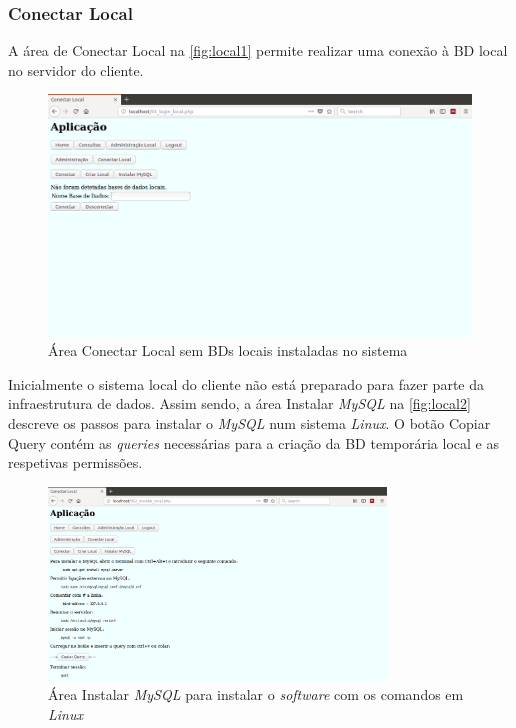 \documentclass[11pt,twoside,a4paper]{report}
\begin{document}
\subsubsection{Conectar Local}
\label{subchap:local}
A área de Conectar Local na \autoref{fig:local1} permite realizar uma conexão à BD local no servidor do cliente.
	\begin{figure}[H]
		\centering
			\includegraphics[trim={0 11cm 0 0},clip,width=1\textwidth]{local04} %
			\caption[Área Conectar Local sem BDs locais]{Área Conectar Local sem BDs locais instaladas no sistema}
			\label{fig:local1}
	\end{figure}
Inicialmente o sistema local do cliente não está preparado para fazer parte da infraestrutura de dados. Assim sendo, a área Instalar \textit{MySQL} na \autoref{fig:local2} descreve os passos para instalar o \textit{MySQL} num sistema \textit{Linux}. O botão Copiar Query contém as \textit{queries} necessárias para a criação da BD temporária local e as respetivas permissões.
\newpage
\begin{figure}[H]
	\centering
	\includegraphics[width=0.8\textwidth]{local01} %
	\caption{Área Instalar \textit{MySQL} para instalar o \textit{software} com os comandos em \textit{Linux}}
	\label{fig:local2}
\end{figure}
\end{document}
